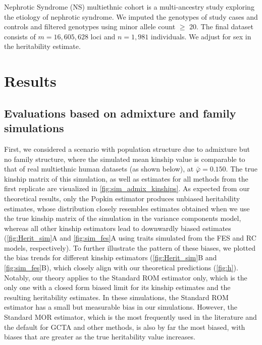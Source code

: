 \documentclass[11pt]{article}
\begin{document}
Nephrotic Syndrome (NS) multiethnic cohort is a multi-ancestry study exploring the etiology of nephrotic syndrome. We imputed the genotypes of study cases and controls and filtered genotypes using minor allele count $\ge$ 20. The final dataset consists of $m=16,605,628  $ loci and $n=1,981 $ individuals. We adjust for sex in the heritability estimate.

\section{Results}

\subsection{Evaluations based on admixture and family simulations}

First, we considered a scenario with population structure due to admixture but no family structure, where the simulated mean kinship value is comparable to that of real multiethnic human datasets (as shown below), at $\bar{\varphi} = 0.150$.  The true kinship matrix of this simulation, as well as estimates for all methods from the first replicate are visualized in \cref{fig:sim_admix_kinships}.  As expected from our theoretical results, only the Popkin estimator produces unbiased heritability estimates, whose distribution closely resembles estimates obtained when we use the true kinship matrix of the simulation in the variance components model, whereas all other kinship estimators lead to downwardly biased estimates (\cref{fig:Herit_sim}A and \cref{fig:sim_fes}A using traits simulated from the FES and RC models, respectively).  To further illustrate the pattern of these biases, we plotted the bias trends for different kinship estimators (\cref{fig:Herit_sim}B and \cref{fig:sim_fes}B), which closely align with our theoretical predictions (\cref{fig:h}).  Notably, our theory applies to the Standard ROM estimator only, which is the only one with a closed form biased limit for its kinship estimates and the resulting heritability estimates.  In these simulations, the Standard ROM estimator has a small but measurable bias in our simulations.  However, the Standard MOR estimator, which is the most frequently used in the literature and the default for GCTA and other methods, is also by far the most biased, with biases that are greater as the true heritability value increases.
\end{document}

